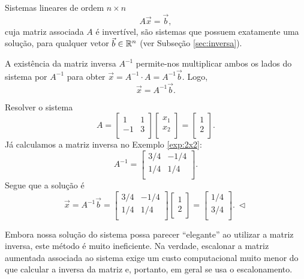 \documentclass[../livro.tex]{subfiles}  %
\begin{document}
Sistemas lineares de ordem $n \times n$
\[
A \vec{x} = \vec{b},
\] cuja matriz associada $A$ é invertível, são sistemas que possuem exatamente uma solução, para qualquer vetor $\vec{b} \in \mathbb{R}^n$ (ver Subseção \ref{sec:inversa}).

A existência da matriz inversa $A^{-1}$ permite-nos multiplicar ambos os lados do sistema por $A^{-1}$ para obter $\vec{x} = A^{-1} \cdot A = A^{-1} \vec{b}.$ Logo,
\[
\boxed{\vec{x} = A^{-1} \vec{b}.}
\]


\begin{example}
	Resolver o sistema
	\[
	A = \left[
	\begin{array}{cc}
	1 & 1  \\
	-1 & 3 \\
	\end{array}
	\right] \left[
	\begin{array}{c}
	x_1  \\
	x_2 \\
	\end{array}
	\right] =
	\left[
	\begin{array}{c}
	1  \\
	2 \\
	\end{array}
	\right].
	\] Já calculamos a matriz inversa no Exemplo \ref{exp:2x2}:
	\[
	A^{-1}  =
	\left[
	\begin{array}{cc}
	3/4 & -1/4  \\
	1/4 & 1/4 \\
	\end{array}
	\right].
	\] Segue que a solução é
	\[
	\vec{x} = A^{-1} \vec{b} =
	\left[
	\begin{array}{cc}
	3/4 & -1/4  \\
	1/4 & 1/4 \\
	\end{array}
	\right]\left[
	\begin{array}{c}
	1  \\
	2 \\
	\end{array}
	\right] =
	\left[
	\begin{array}{c}
	1/4 \\
	3/4 \\
	\end{array}
	\right]. \ \lhd
	\]
\end{example}


Embora nossa solução do sistema possa parecer ``elegante'' ao utilizar a matriz inversa, este método é muito ineficiente. Na verdade, escalonar a matriz aumentada associada ao sistema exige um custo computacional muito menor do que calcular a inversa da matriz e, portanto, em geral se usa o escalonamento.
\end{document}
